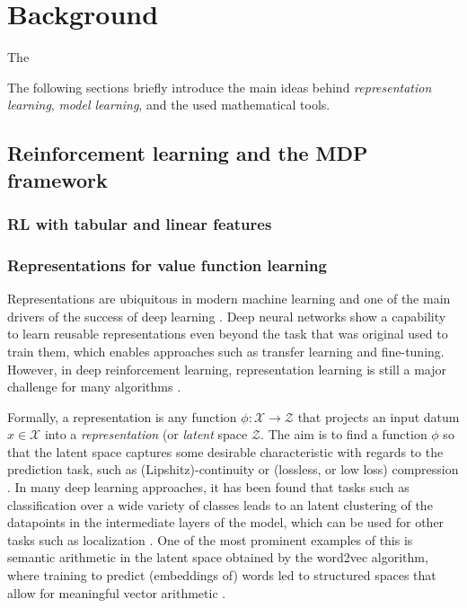 \chapter{Background}

The 

The following sections briefly introduce the main ideas behind \emph{representation learning}, \emph{model learning}, and the used mathematical tools.


\section{Reinforcement learning and the MDP framework}

\subsection{RL with tabular and linear features}

\subsection{Representations for value function learning}

Representations are ubiquitous in modern machine learning and one of the main drivers of the success of deep learning \parencite{bengio2012representation}.
Deep neural networks show a capability to learn reusable representations even beyond the task that was original used to train them, which enables approaches such as transfer learning and fine-tuning.
However, in deep reinforcement learning, representation learning is still a major challenge for many algorithms \parencite{hasselt2018reinforcement}.

Formally, a representation is any function $\phi: \mathcal{X} \rightarrow \mathcal{Z}$ that projects an input datum $x \in \mathcal{X}$ into a \emph{representation} (or \emph{latent} space $\mathcal{Z}$. 
The aim is to find a function $\phi$ so that the latent space captures some desirable characteristic with regards to the prediction task, such as (Lipshitz)-continuity or (lossless, or low loss) compression \parencite{le2021metrics,abel2020thesis}.
In many deep learning approaches, it has been found that tasks such as classification over a wide variety of classes leads to an latent clustering of the datapoints in the intermediate layers of the model, which can be used for other tasks such as localization \parencite{bengio2012representation}.
One of the most prominent examples of this is semantic arithmetic in the latent space obtained by the word2vec algorithm, where training to predict (embeddings of) words led to structured spaces that allow for meaningful vector arithmetic \parencite{mikolov2013distirbuted,goldberg2014word2vec}.


